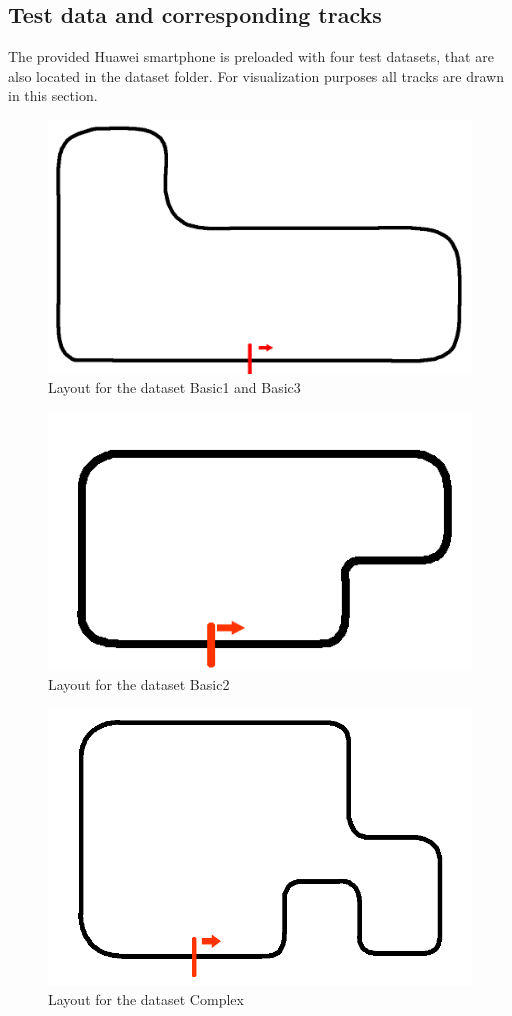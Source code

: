 \subsection{Test data and corresponding tracks}
The provided Huawei smartphone is preloaded with four test datasets, that are also located in the dataset folder. For visualization purposes all tracks are drawn in this section.
\begin{figure}[H]
	\centering
	\includegraphics[scale= 0.5]{Pictures/Basic1.png}
	\caption{Layout for the dataset Basic1 and Basic3}
	\label{Basic1}
\end{figure}
\begin{figure}[H]
	\centering
	\includegraphics[scale= 1]{Pictures/Basic2.png}
	\caption{Layout for the dataset Basic2}
	\label{Basic2}
\end{figure}
\begin{figure}[H]
	\centering
	\includegraphics[scale= 0.5]{Pictures/Complex.png}
	\caption{Layout for the dataset Complex}
	\label{Complex}
\end{figure}


